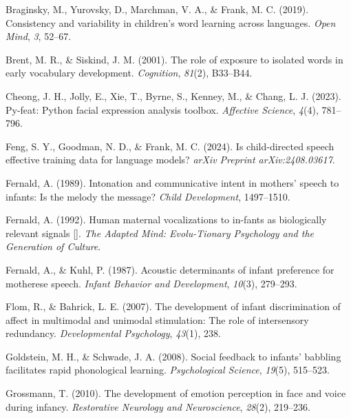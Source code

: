 \documentclass[10pt, letterpaper]{article}
\begin{document}
\begin{CSLReferences}{1}{0}
Braginsky, M., Yurovsky, D., Marchman, V. A., \& Frank, M. C. (2019).
Consistency and variability in children's word learning across
languages. \emph{Open Mind}, \emph{3}, 52--67.

Brent, M. R., \& Siskind, J. M. (2001). The role of exposure to isolated
words in early vocabulary development. \emph{Cognition}, \emph{81}(2),
B33--B44.

Cheong, J. H., Jolly, E., Xie, T., Byrne, S., Kenney, M., \& Chang, L.
J. (2023). Py-feat: Python facial expression analysis toolbox.
\emph{Affective Science}, \emph{4}(4), 781--796.

Feng, S. Y., Goodman, N. D., \& Frank, M. C. (2024). Is child-directed
speech effective training data for language models? \emph{arXiv Preprint
arXiv:2408.03617}.

Fernald, A. (1989). Intonation and communicative intent in mothers'
speech to infants: Is the melody the message? \emph{Child Development},
1497--1510.

Fernald, A. (1992). Human maternal vocalizations to in-fants as
biologically relevant signals {[}{]}. \emph{The Adapted Mind:
Evolu-Tionary Psychology and the Generation of Culture}.

Fernald, A., \& Kuhl, P. (1987). Acoustic determinants of infant
preference for motherese speech. \emph{Infant Behavior and Development},
\emph{10}(3), 279--293.

Flom, R., \& Bahrick, L. E. (2007). The development of infant
discrimination of affect in multimodal and unimodal stimulation: The
role of intersensory redundancy. \emph{Developmental Psychology},
\emph{43}(1), 238.

Goldstein, M. H., \& Schwade, J. A. (2008). Social feedback to infants'
babbling facilitates rapid phonological learning. \emph{Psychological
Science}, \emph{19}(5), 515--523.

Grossmann, T. (2010). The development of emotion perception in face and
voice during infancy. \emph{Restorative Neurology and Neuroscience},
\emph{28}(2), 219--236.


\end{CSLReferences}
\end{document}
